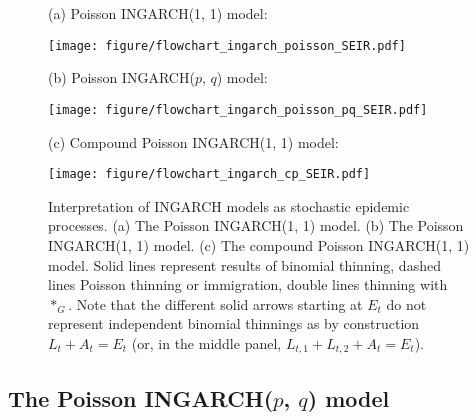 \documentclass{article}
\begin{document}
\begin{figure}
\center
(a) Poisson INGARCH(1, 1) model:

\medskip

\medskip

\texttt{[image: figure/flowchart\_ingarch\_poisson\_SEIR.pdf]}

\medskip

\medskip

(b) Poisson INGARCH($p$, $q$) model:

\medskip
\texttt{[image: figure/flowchart\_ingarch\_poisson\_pq\_SEIR.pdf]}

\medskip

\medskip

(c) Compound Poisson INGARCH(1, 1) model:

\medskip

\medskip

\texttt{[image: figure/flowchart\_ingarch\_cp\_SEIR.pdf]}
\caption{Interpretation of INGARCH models as stochastic epidemic processes. (a) The Poisson INGARCH(1, 1) model. (b) The Poisson INGARCH(1, 1) model. (c) The compound Poisson INGARCH(1, 1) model. Solid lines represent results of binomial thinning, dashed lines Poisson thinning or immigration, double lines thinning with $*_G$. Note that the different solid arrows starting at $E_t$ do not represent independent binomial thinnings as by construction  $L_t + A_t = E_t$ (or, in the middle panel, $L_{t, 1} + L_{t, 2} + A_t = E_t$).}
\label{fig:ingarch_flowchart_poisson}
\end{figure}


\subsection{The Poisson INGARCH($p$, $q$) model}
\label{subsec:poissonpq}
\end{document}

